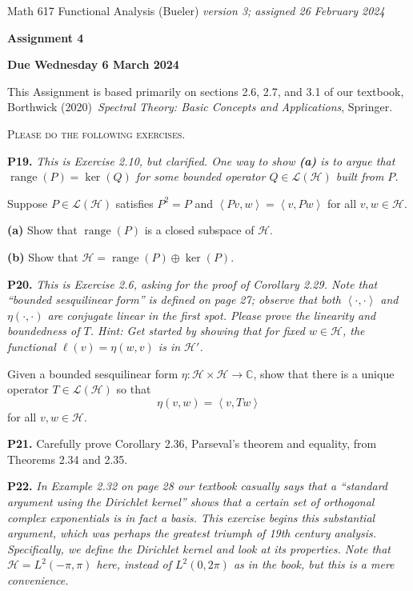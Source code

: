 \documentclass[12pt]{amsart}
\newcommand{\cH}{\mathcal{H}}
\newcommand{\cL}{\mathcal{L}}
\newcommand{\CC}{\mathbb{C}}
\newcommand{\ip}[2]{\ensuremath{\left<#1,#2\right>}}
\newcommand{\range}{\operatorname{range}}
\newcommand{\prob}[1]{\bigskip\noindent\textbf{#1.}\quad }
\newcommand{\epart}[1]{\medskip\noindent\textbf{(#1)}\quad }
\begin{document}
\scriptsize \noindent Math 617 Functional Analysis (Bueler) \hfill \emph{version 3; assigned 26 February 2024}
\normalsize\medskip

\Large\centerline{\textbf{Assignment 4}}
\large
\medskip

\centerline{\textbf{Due Wednesday 6 March 2024}}
\medskip
\normalsize

\thispagestyle{empty}

\bigskip
\noindent This Assignment is based primarily on sections 2.6, 2.7, and 3.1 of our textbook, Borthwick (2020)~\emph{Spectral Theory: Basic Concepts and Applications}, Springer.

\medskip
\noindent \textsc{Please do the following exercises.}
\smallskip


\prob{P19}  \emph{This is Exercise 2.10, but clarified.  One way to show \emph{\textbf{(a)}} is to argue that $\range(P)=\ker(Q)$ for some bounded operator $Q\in\cL(\cH)$ built from $P$.}

\medskip\noindent Suppose $P\in\cL(\cH)$ satisfies $P^2=P$ and $\ip{Pv}{w} = \ip{v}{Pw}$ for all $v,w\in\cH$.

\epart{a}  Show that $\range(P)$ is a closed subspace of $\cH$.

\epart{b}  Show that $\cH = \range(P) \oplus \ker(P)$.


\prob{P20}  \emph{This is Exercise 2.6, asking for the proof of Corollary 2.29.  Note that ``bounded sesquilinear form'' is defined on page 27; observe that both $\ip{\cdot}{\cdot}$ and $\eta(\cdot,\cdot)$ are conjugate linear in the first spot.  Please prove the linearity and boundedness of $T$.  Hint: Get started by showing that for fixed $w\in\cH$, the functional $\ell(v) = \eta(w,v)$ is in $\cH'$.}

\medskip\noindent Given a bounded sesquilinear form $\eta:\cH\times \cH \to \CC$, show that there is a unique operator $T\in \cL(\cH)$ so that
	$$\eta(v,w) = \ip{v}{Tw}$$
for all $v,w\in\cH$.


\prob{P21}  Carefully prove Corollary 2.36, Parseval's theorem and equality, from Theorems 2.34 and 2.35.


\prob{P22}  \emph{In Example 2.32 on page 28 our textbook casually says that a ``standard argument using the Dirichlet kernel'' shows that a certain set of orthogonal complex exponentials is in fact a basis.  This exercise begins this substantial argument, which was perhaps the greatest triumph of 19th century analysis.  Specifically, we define the Dirichlet kernel and look at its properties.  Note that $\cH=L^2(-\pi,\pi)$ here, instead of $L^2(0,2\pi)$ as in the book, but this is a mere convenience.}
\end{document}
